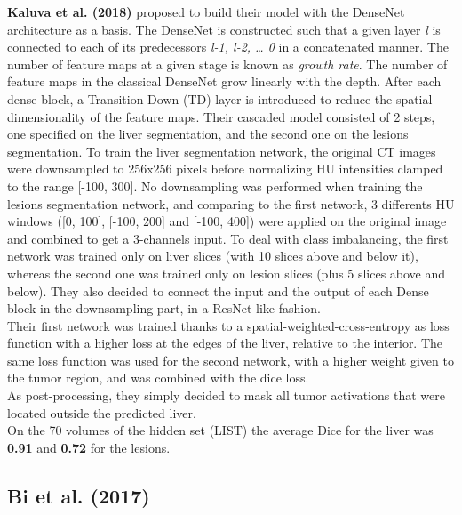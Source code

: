 \textbf{Kaluva et al. (2018)} proposed to build their model with the
DenseNet architecture as a basis. The DenseNet is constructed such that
a given layer \emph{l} is connected to each of its predecessors
\emph{l-1, l-2, \ldots{} 0} in a concatenated manner. The number of
feature maps at a given stage is known as \emph{growth rate}. The number
of feature maps in the classical DenseNet grow linearly with the depth.
After each dense block, a Transition Down (TD) layer is introduced to
reduce the spatial dimensionality of the feature maps.
Their cascaded model consisted of 2 steps, one specified on the liver
segmentation, and the second one on the lesions segmentation.
To train the liver segmentation network, the original CT images were
downsampled to 256x256 pixels before normalizing HU intensities clamped
to the range {[}-100, 300{]}.
No downsampling was performed when training the lesions segmentation
network, and comparing to the first network, 3 differents HU windows
({[}0, 100{]}, {[}-100, 200{]} and {[}-100, 400{]}) were applied on the
original image and combined to get a 3-channels input.
To deal with class imbalancing, the first network was trained only on
liver slices (with 10 slices above and below it), whereas the second one
was trained only on lesion slices (plus 5 slices above and below).
They also decided to connect the input and the output of each Dense
block in the downsampling part, in a ResNet-like fashion.\\
Their first network was trained thanks to a
spatial-weighted-cross-entropy as loss function with a higher loss at
the edges of the liver, relative to the interior. The same loss function
was used for the second network, with a higher weight given to the tumor
region, and was combined with the dice loss.\\
As post-processing, they simply decided to mask all tumor activations
that were located outside the predicted liver.\\
On the 70 volumes of the hidden set (LIST) the average Dice for the
liver was \textbf{0.91} and \textbf{0.72} for the lesions.

\subsection*{Bi et al. (2017)}\label{bi-et-al.-2017}

